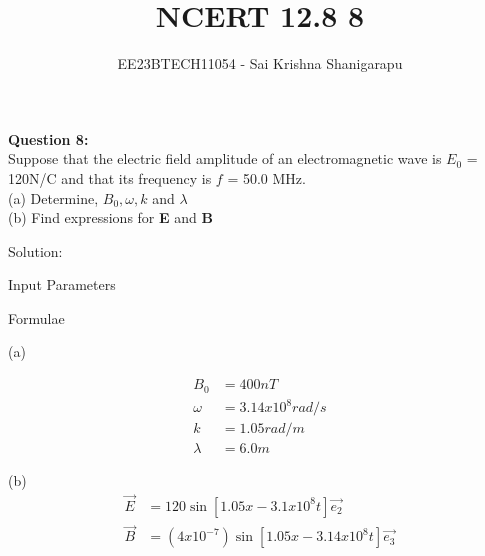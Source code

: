 \documentclass[journal,12pt,twocolumn]{IEEEtran}
\theoremstyle{remark}
\begin{document}

\vspace{3cm}

\title{NCERT 12.8 8}
\author{EE23BTECH11054 - Sai Krishna Shanigarapu%
}
\maketitle
\newpage
\bigskip

\begin{flushleft}
\textbf{Question 8:}\\
Suppose that the electric field amplitude of an electromagnetic wave is $E_0$ = 120N/C and that its frequency is $f$ = 50.0 MHz.\\
(a) Determine, $B_0, \omega, k$ and $\lambda$\\
(b) Find expressions for \textbf{E} and \textbf{B}\\
\end{flushleft}

\bigskip

\begin{flushleft}
Solution:
\end{flushleft}

\begin{center}
    \begin{table}[ht]
        \caption{Input Parameters}
        
        \label{tab:table1.12.8.8}
    \end{table}
\end{center}

\begin{flushleft}
    \begin{table}[ht]
       \caption{Formulae}
       
       \label{tab:table2.12.8.8}
    \end{table}
\bigskip
\end{flushleft}
\bigskip
\bigskip
\bigskip
\begin{flushleft}
    (a)
\end{flushleft}

\begin{align}
    B_0  &= 400nT\\
    \omega &= 3.14 x 10^8 rad/s\\
    k &= 1.05 rad/m\\
    \lambda &=  6.0m 
\end{align}

\begin{flushleft}
    (b)\\ 
    \begin{align}
    \vec{E} &= 120 \sin[1.05x - 3.1 x 10^8t]\vec{e_2}\\
    \vec{B} &= (4 x 10^{-7})\sin[1.05x - 3.14 x 10^8t]\vec{e_3}
    \end{align} 
\end{flushleft}
\end{document}
